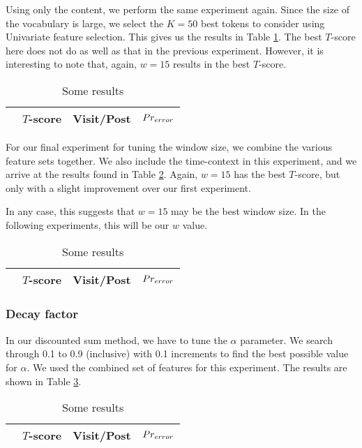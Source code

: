 Using only the content, we perform the same experiment again. Since the size of 
the vocabulary is large, we select the $K = 50$ best tokens to consider using 
Univariate feature selection. This gives us the results in Table 
\ref{tbl:par_tune_content}. The best $T$-score here does not do as well as that 
in the previous experiment. However, it is interesting to note that, again, 
$w=15$ results in the best $T$-score.

\begin{table}
	\footnotesize
\begin{center}
\begin{tabular}{| l | c | c | c |}
\hline
& $T$-score			   &	Visit/Post & 	$Pr_{error}$\\
\hline
	
\hline
\end{tabular}
\end{center}
\caption{Some results}\label{tbl:par_tune_content}
\end{table}

For our final experiment for tuning the window size, we combine the various 
feature sets together. We also include the time-context in this experiment, and 
we arrive at the results found in Table \ref{tbl:par_tune_comb}. Again, $w=15$ 
has the best $T$-score, but only with a slight improvement over our first 
experiment.

In any case, this suggests that $w=15$ may be the best window size. In the 
following experiments, this will be our $w$ value.

\begin{table}
	\footnotesize
\begin{center}
\begin{tabular}{| l | c | c | c |}
\hline
& $T$-score			   &	Visit/Post & 	$Pr_{error}$\\
\hline

\hline
\end{tabular}
\end{center}
\caption{Some results}\label{tbl:par_tune_comb}
\end{table}


\subsubsection{Decay factor}
In our discounted sum method, we have to tune the $\alpha$ parameter. We search 
through 0.1 to 0.9 (inclusive) with 0.1 increments to find the best possible 
value for $\alpha$.  We used the combined set of features for this experiment.
The results are shown in Table \ref{tbl:par_tune_decay}.
\begin{table}
	\footnotesize
\begin{center}
\begin{tabular}{| l | c | c | c |}
\hline
& $T$-score			   &	Visit/Post & 	$Pr_{error}$\\
\hline
	
\hline
\end{tabular}
\end{center}
\caption{Some results}\label{tbl:par_tune_decay}
\end{table}

